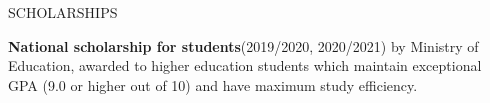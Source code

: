 \begin{minipage}[t]{\linewidth}\vspace{\sectionTopmargin}
{\alignRight\titleFont\light SCHOLARSHIPS}\linebreak\newline

\vspace{\rContentTopMargin}
{\contentFont\textbf{National scholarship for students}\linebreak (2019/2020, 2020/2021)  by Ministry of Education, awarded to higher education students which maintain exceptional GPA (9.0 or higher out of 10) and have maximum study efficiency.}\alignRight\linebreak
\end{minipage}\newline